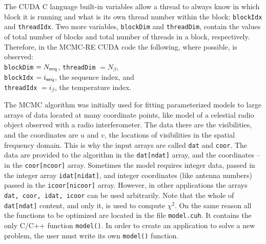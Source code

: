 \documentclass[preprint2]{aastex}
\begin{document}
The CUDA C language built-in variables allow a thread to always
know in which block it is running and what is its own thread number 
within the block: \verb|blockIdx| and \verb|threadIdx|. Two more variables,
\verb|blockDim| and \verb|threadDim|, contain the values of total number
of blocks and total number of threads in a block, respectively. Therefore,
in the MCMC-RE CUDA code the following, where possible, is observed: \\
\verb|blockDim| $ = N_{\rm seq}$, \verb|threadDim| $ = N_\beta$, \\
\verb|blockIdx| $ = i_{\rm seq}$, the sequence index, and \\
\verb|threadIdx| $ = i_\beta$, the temperature index. 

The MCMC algorithm was initially used for fitting parameterized models
to large arrays of data located at many coordinate points, like model 
of a celestial radio object observed with a radio interferometer. 
The data there are the visibilities, and the coordinates are
$u$ and $v$, the locations of visibilities in the spatial frequency domain.
This is why the input arrays are called \verb|dat| and \verb|coor|.
The data are provided to the algorithm in the \verb|dat[ndat]| array, and
the coordinates -- in the \verb|coor[ncoor]| array.  
Sometimes the model requires
integer data, passed in the integer array \verb|idat[nidat]|, and integer
coordinates (like antenna numbers) passed in the \verb|icoor[nicoor]| array.
However,  in other applications the arrays \verb|dat, coor, idat, icoor| 
can be used arbitrarily. Note that the whole of \verb|dat[ndat]| content, 
and only it, is used to compute $\chi^2$. On the same reason all the functions
to be optimized are located in the file \verb|model.cuh|. It contains the 
only C/C++ function \verb|model()|. In order to create an application to
solve a new problem, the user must write its own \verb|model()| function.
\end{document}
